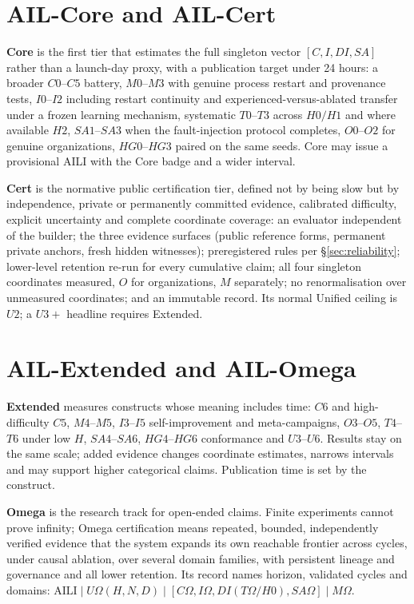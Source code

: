 \documentclass[11pt]{article}
\theoremstyle{definition}
\newcommand{\Om}{\ensuremath{\Omega}}
\begin{document}
\section{AIL-Core and AIL-Cert}\label{sec:corecert}

\textbf{Core} is the first tier that estimates the full singleton vector $[C, I, DI, SA]$ rather than a launch-day proxy, with a publication target under 24 hours: a broader $C0$--$C5$ battery, $M0$--$M3$ with genuine process restart and provenance tests, $I0$--$I2$ including restart continuity and experienced-versus-ablated transfer under a frozen learning mechanism, systematic $T0$--$T3$ across $H0/H1$ and where available $H2$, $SA1$--$SA3$ when the fault-injection protocol completes, $O0$--$O2$ for genuine organizations, $HG0$--$HG3$ paired on the same seeds. Core may issue a provisional AILI with the Core badge and a wider interval.

\textbf{Cert} is the normative public certification tier, defined not by being slow but by independence, private or permanently committed evidence, calibrated difficulty, explicit uncertainty and complete coordinate coverage: an evaluator independent of the builder; the three evidence surfaces (public reference forms, permanent private anchors, fresh hidden witnesses); preregistered rules per \S\ref{sec:reliability}; lower-level retention re-run for every cumulative claim; all four singleton coordinates measured, $O$ for organizations, $M$ separately; no renormalisation over unmeasured coordinates; and an immutable record. Its normal Unified ceiling is $U2$; a $U3{+}$ headline requires Extended.

\section{AIL-Extended and AIL-Omega}\label{sec:extomega}

\textbf{Extended} measures constructs whose meaning includes time: $C6$ and high-difficulty $C5$, $M4$--$M5$, $I3$--$I5$ self-improvement and meta-campaigns, $O3$--$O5$, $T4$--$T6$ under low $H$, $SA4$--$SA6$, $HG4$--$HG6$ conformance and $U3$--$U6$. Results stay on the same scale; added evidence changes coordinate estimates, narrows intervals and may support higher categorical claims. Publication time is set by the construct.

\textbf{Omega} is the research track for open-ended claims. Finite experiments cannot prove infinity; Omega certification means repeated, bounded, independently verified evidence that the system expands its own reachable frontier across cycles, under causal ablation, over several domain families, with persistent lineage and governance and all lower retention. Its record names horizon, validated cycles and domains: $\mathrm{AILI} \mid U\Om(H, N, D) \mid [C\Om, I\Om, DI(T\Om/H0), SA\Om] \mid M\Om$.
\end{document}
